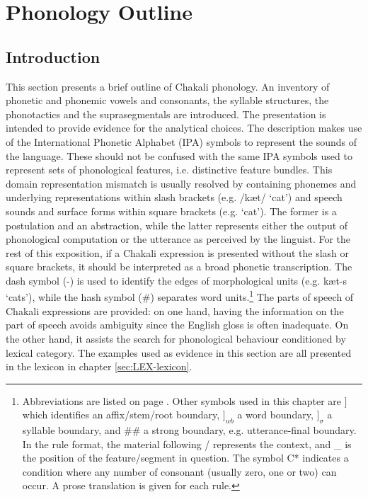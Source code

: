 \chapter{Phonology Outline}
\label{sec:chap-phono}


\section{Introduction}
\label{sec:intro-phono}

This section presents a brief outline of Chakali phonology. An inventory
of phonetic and phonemic vowels and consonants, the syllable
structures, the phonotactics and the suprasegmentals are introduced.  The
presentation is intended
to provide evidence for the analytical choices.  The description
makes use of the International Phonetic Alphabet (IPA)  symbols to represent the
sounds
of the language. These should not be confused with the same IPA symbols used to 
represent  sets of phonological features, i.e.  distinctive feature bundles.
This domain representation mismatch is usually resolved by containing phonemes
and underlying representations within slash brackets  (e.g. {\I
/kæt/} `cat')  and  speech sounds and surface forms within square brackets (e.g.
{\I
[kʰæʔ]} `cat'). The former is a postulation and an abstraction,
while the latter  represents either the output of
phonological computation or the utterance as perceived by the linguist.  For the
rest
of this
exposition, if a Chakali expression is presented without the slash or  square
brackets, it should be interpreted as a broad phonetic
transcription.  The dash symbol (-) is
used to identify the edges of morphological units (e.g. kæt-s `cats'),  while 
the hash symbol (\#) separates word units.\footnote{Abbreviations are
listed on page \pageref{sec-ABB}. Other symbols used in this chapter are 
$]$ which identifies an
affix/stem/root boundary,  $]_{wb}$  a word boundary,   $]_{\sigma}$  a
syllable  boundary, and  \#\#  a strong boundary, e.g.
utterance-final boundary. In the rule format,   the material following / 
represents the context,  and \_ is the position of the feature/segment in
question. The symbol C* indicates a condition where any number
of consonant (usually zero, one or two) can occur. A prose translation is given
for each rule.}  The parts of speech
of  Chakali expressions are provided: on one hand,  having the  information
on the part
of speech avoids ambiguity since the English gloss is often inadequate. On the
other hand,  it assists the search for phonological behaviour conditioned by
lexical category. The examples used as evidence in this section are all
presented in the lexicon in chapter \ref{sec:LEX-lexicon}. 
 

